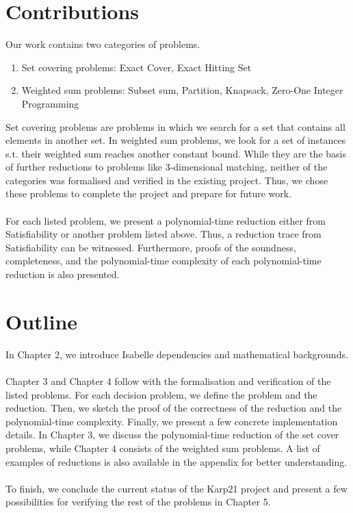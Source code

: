 \section{Contributions}
Our work contains two categories of problems. 
\begin{enumerate}
    \item Set covering problems: Exact Cover, Exact Hitting Set
    \item Weighted sum problems: Subset sum, Partition, Knapsack, Zero-One Integer Programming
\end{enumerate}
Set covering problems are problems in which we search for a set that contains all elements in another set. In weighted sum problems, 
we look for a set of instances s.t. their weighted sum reaches another constant bound. While they are the basis of further reductions to problems like 
3-dimensional matching, neither of the categories was formalised and verified in the existing project. 
Thus, we chose these problems to complete the project and prepare for future work.\\\\ 
For each listed problem, we present a polynomial-time reduction either from Satisfiability or another problem listed above. 
Thus, a reduction trace from Satisfiability can be witnessed. 
Furthermore, proofs of the soundness, completeness, 
and the polynomial-time complexity of each polynomial-time reduction is also presented. 

\section{Outline}
In Chapter 2, we introduce Isabelle dependencies and mathematical backgrounds.\\\\
Chapter 3 and Chapter 4 follow with the formalisation and verification of the listed problems. For each decision problem, 
we define the problem and the reduction. Then, we sketch the proof of the correctness of the reduction and the polynomial-time complexity. 
Finally, we present a few concrete implementation details.
In Chapter 3, we discuss the polynomial-time reduction of the set cover problems, while Chapter 4 consists of the weighted sum problems.
A list of examples of reductions is also available in the appendix for better understanding.\\\\
To finish, we conclude the current status of the Karp21 project
and present a few possibilities for verifying the rest of the problems in Chapter 5.
